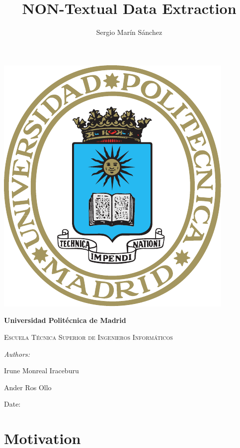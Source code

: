 \documentclass[12pt]{article}
\title{ NON-Textual Data Extraction %
}
\author{ Sergio Marín Sánchez %
}
\begin{document}
\begin{titlepage}
    \centering
    \phantom{a}
    \vspace{1cm}
    {\includegraphics{ESCUDO_UPM.pdf}\par}
    \vspace{1cm}
    {\bfseries\LARGE Universidad Politécnica de Madrid \par}
    \vspace{1cm}
    {\scshape\Large Escuela Técnica Superior de Ingenieros Informáticos \par}
    \vspace{1cm}
    {\scshape\Huge \thetitle \par}
    \vfill
    {\itshape\large Authors: %
     \par}
    {\large \theauthor \par}
    {\large Irune Monreal Iraceburu \par}
    {\large Ander Ros Ollo \par}
    \vspace{0.2cm}
    {\large Date:  \par}
\end{titlepage}

\section{Motivation}
\end{document}
